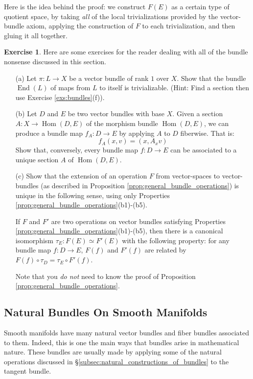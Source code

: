 \documentclass[12pt]{article}
\theoremstyle{definition}
\newtheorem{exercise}[theorem]{Exercise}
\numberwithin{equation}{section}
\newcommand{\op}{\operatorname}
\begin{document}
 Here is the idea behind the proof: we construct $F(E)$ as a certain type of quotient space, by taking \emph{all} of the local trivializations provided by the vector-bundle axiom, applying the construction of $F$ to each trivialization, and then gluing it all together. 

\begin{exercise} \label{ex:bundle_constructions} Here are some exercises for the reader dealing with all of the bundle nonsense discussed in this section. 

\begin{enumerate}
	\item[(a)] Let $\pi:L \to X$ be a vector bundle of rank $1$ over $X$. Show that the bundle $\op{End}(L)$ of maps from $L$ to itself is trivializable. (Hint: Find a section then use Exercise \ref{exs:bundles}(f)).
	\item[(b)] Let $D$ and $E$ be two vector bundles with base $X$. Given a section $A:X \to \op{Hom}(D,E)$ of the morphism bundle $\op{Hom}(D,E)$, we can produce a bundle map $f_A:D \to E$ by applying $A$ to $D$ fiberwise. That is:
	\[f_A(x,v) = (x,A_xv)\]
	Show that, conversely, every bundle map $f:D \to E$ can be associated to a unique section $A$ of $\op{Hom}(D,E)$.
	\item[(c)] Show that the extension of an operation $F$ from vector-spaces to vector-bundles (as described in Proposition \ref{prop:general_bundle_operations}) is unique in the following sense, using only Properties \ref{prop:general_bundle_operations}(b1)-(b5).

	If $F$ and $F'$ are two operations on vector bundles satisfying Properties \ref{prop:general_bundle_operations}(b1)-(b5), then there is a canonical isomorphism $\tau_E:F(E) \simeq F'(E)$ with the following property: for any bundle map $f:D \to E$, $F(f)$ and $F'(f)$ are related by $F(f) \circ \tau_D = \tau_E \circ F'(f)$.

	Note that you \emph{do not} need to know the proof of Proposition \ref{prop:general_bundle_operations}.



\end{enumerate}
\end{exercise}

\subsection{Natural Bundles On Smooth Manifolds} \label{subsec:natural_bundles_on_manifolds} Smooth manifolds have many natural vector bundles and fiber bundles associated to them. Indeed, this is one the main ways that bundles arise in mathematical nature. These bundles are usually made by applying some of the natural operations discussed in \S \ref{subsec:natural_constructions_of_bundles} to the tangent bundle.
\end{document}
